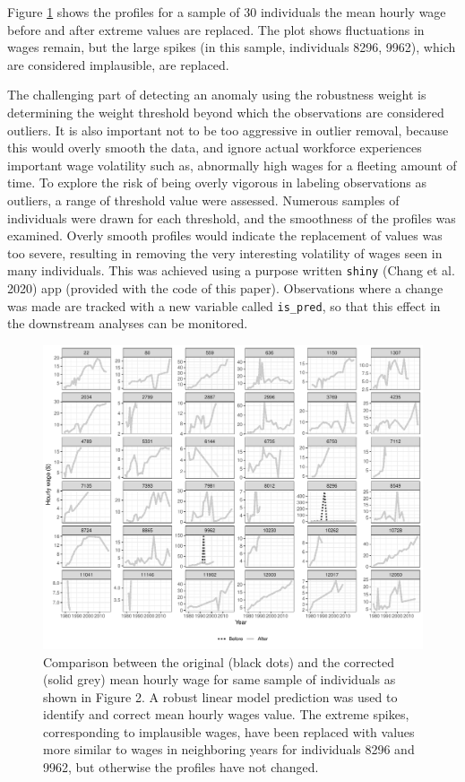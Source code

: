 \documentclass[12pt]{article}
\begin{document}
Figure \ref{fig:compare-plot} shows the profiles for a sample of 30 individuals the mean hourly wage before and after extreme values are replaced. The plot shows fluctuations in wages remain, but the large spikes (in this sample, individuals 8296, 9962), which are considered implausible, are replaced.

The challenging part of detecting an anomaly using the robustness weight is determining the weight threshold beyond which the observations are considered outliers. It is also important not to be too aggressive in outlier removal, because this would overly smooth the data, and ignore actual workforce experiences important wage volatility such as, abnormally high wages for a fleeting amount of time. To explore the risk of being overly vigorous in labeling observations as outliers, a range of threshold value were assessed. Numerous samples of individuals were drawn for each threshold, and the smoothness of the profiles was examined. Overly smooth profiles would indicate the replacement of values was too severe, resulting in removing the very interesting volatility of wages seen in many individuals. This was achieved using a purpose written \texttt{shiny} (Chang et al. 2020) app (provided with the code of this paper). Observations where a change was made are tracked with a new variable called \texttt{is\_pred}, so that this effect in the downstream analyses can be monitored.

\begin{figure}

{\centering \includegraphics[width=0.9\linewidth]{figures/compare-plot-1} 

}

\caption{Comparison between the original (black dots) and the corrected (solid grey) mean hourly wage for same sample of individuals as shown in Figure 2. A robust linear model prediction was used to identify and correct mean hourly wages value. The extreme spikes, corresponding to implausible wages, have been replaced with values more similar to wages in neighboring years for individuals 8296 and 9962, but otherwise the profiles have not changed.}\label{fig:compare-plot}
\end{figure}
\end{document}
